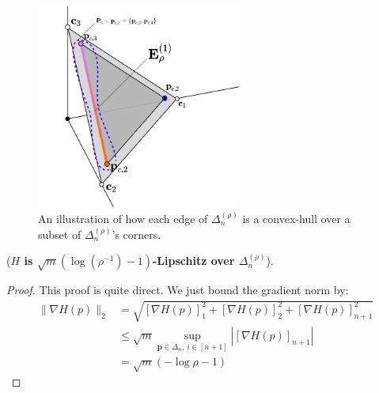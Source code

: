 \begin{figure}[h!]
    \centering
    \includegraphics[width=0.6\textwidth]{figures/nvSimplexBorder.png}
    \caption{An illustration of how each edge of $\Delta^{(\rho)}_n$ is a convex-hull over a subset of $\Delta^{(\rho)}_n$'s corners.}
    \label{fig:nvsimplex_border}
\end{figure}

\begin{proposition}
    \label{prop:H_Lipschitz_over_K}
    (\textbf{$H$ is $\sqrt{m}(\log(\rho^{-1}) -1 )$-Lipschitz over $\Delta^{(\rho)}_n$}). 
    
\end{proposition}

\begin{proof}
    This proof is quite direct. We just bound the gradient norm by:
    \begin{align*}
        \| \nabla H(p) \|_2 &= \sqrt{ [ \nabla H(p) ]_1^2 + [ \nabla H(p) ]_2^2 + [ \nabla H(p) ]_{n+1}^2 } \\
        & \leq \sqrt{m} \sup_{\textbf{p} \in \Delta_n, ~ i\in [n+1]} |[ \nabla H(p) ]_{n+1}| \\
        & = \sqrt{m} (-\log \rho - 1)
    \end{align*}
\end{proof}


